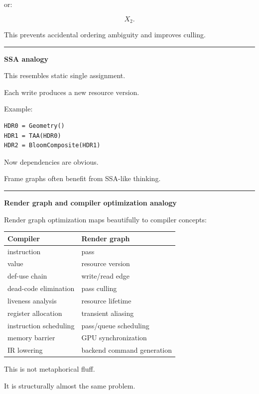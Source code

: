 or:

\[
X_2.
\]

This prevents accidental ordering ambiguity and improves culling.

\begin{center}\rule{0.5\linewidth}{0.5pt}\end{center}

\textbf{SSA analogy}

This resembles static single assignment.

Each write produces a new resource version.

Example:

\begin{verbatim}
HDR0 = Geometry()
HDR1 = TAA(HDR0)
HDR2 = BloomComposite(HDR1)
\end{verbatim}

Now dependencies are obvious.

Frame graphs often benefit from SSA-like thinking.

\begin{center}\rule{0.5\linewidth}{0.5pt}\end{center}

\textbf{Render graph and compiler optimization analogy}

Render graph optimization maps beautifully to compiler concepts:

{\def\LTcaptype{none} %
\begin{longtable}[]{@{}ll@{}}
\toprule\noalign{}
Compiler & Render graph \\
\midrule\noalign{}
\endhead
\bottomrule\noalign{}
\endlastfoot
instruction & pass \\
value & resource version \\
def-use chain & write/read edge \\
dead-code elimination & pass culling \\
liveness analysis & resource lifetime \\
register allocation & transient aliasing \\
instruction scheduling & pass/queue scheduling \\
memory barrier & GPU synchronization \\
IR lowering & backend command generation \\
\end{longtable}
}

This is not metaphorical fluff.

It is structurally almost the same problem.

